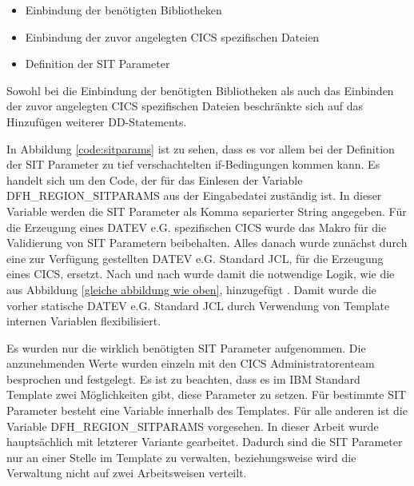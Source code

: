 \begin{samepage}
\begin{itemize}
\item Einbindung der benötigten Bibliotheken
\item Einbindung der zuvor angelegten CICS spezifischen Dateien
\item Definition der SIT Parameter
\end{itemize}
\end{samepage}

Sowohl bei die Einbindung der benötigten Bibliotheken als auch das Einbinden der zuvor angelegten CICS spezifischen Dateien beschränkte sich auf das Hinzufügen weiterer DD-Statements.

In Abbildung \ref{code:sitparams} ist zu sehen, dass es vor allem bei der Definition der SIT Parameter zu tief verschachtelten if-Bedingungen kommen kann.
Es handelt sich um den Code, der für das Einlesen der Variable \glqq DFH\_REGION\_SITPARAMS\grqq{} aus der Eingabedatei zuständig ist.
In dieser Variable werden die SIT Parameter als Komma separierter String angegeben.
Für die Erzeugung eines DATEV e.G. spezifischen CICS wurde das Makro für die Validierung von SIT Parametern beibehalten.
Alles danach wurde zunächst durch eine zur Verfügung gestellten DATEV e.G. Standard JCL, für die Erzeugung eines CICS, ersetzt.
Nach und nach wurde damit die notwendige Logik, wie die aus Abbildung \ref{gleiche abbildung wie oben}, hinzugefügt .
Damit wurde die vorher statische DATEV e.G. Standard JCL durch Verwendung von Template internen Variablen flexibilisiert.

\begin{minipage}{\linewidth}

\end{minipage}

Es wurden nur die wirklich benötigten SIT Parameter aufgenommen.
Die anzunehmenden Werte wurden einzeln mit den CICS Administratorenteam besprochen und festgelegt.
Es ist zu beachten, dass es im IBM Standard Template zwei Möglichkeiten gibt, diese Parameter zu setzen.
Für bestimmte SIT Parameter besteht eine Variable innerhalb des Templates.
Für alle anderen ist die Variable \glqq DFH\_REGION\_SITPARAMS\grqq{} vorgesehen.
In dieser Arbeit wurde hauptsächlich mit letzterer Variante gearbeitet.
Dadurch sind die SIT Parameter nur an einer Stelle im Template zu verwalten, beziehungsweise wird die Verwaltung  nicht auf zwei Arbeitsweisen verteilt.

